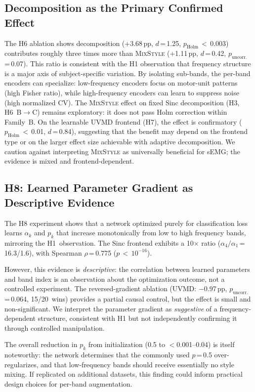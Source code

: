 \documentclass[conference]{IEEEtran}
\newcommand{\pp}{\,pp}
\newcommand{\mixstyle}{\textsc{MixStyle}}
\newcommand{\uvmd}{\textsc{UVMD}}
\begin{document}
\subsection{Decomposition as the Primary Confirmed Effect}
The H6 ablation shows decomposition (+3.68\pp{}, $d$\,=\,1.25, $p_{\mathrm{Holm}}$\,$<$\,0.003) contributes roughly three times more than \mixstyle{} (+1.11\pp{}, $d$\,=\,0.42, $p_{\mathrm{uncorr.}}$\,=\,0.07).
This ratio is consistent with the H1 observation that frequency structure is a major axis of subject-specific variation.
By isolating sub-bands, the per-band encoders can specialize: low-frequency encoders focus on motor-unit patterns (high Fisher ratio), while high-frequency encoders can learn to suppress noise (high normalized CV).
The \mixstyle{} effect on fixed Sinc decomposition (H3, H6~B$\to$C) remains exploratory: it does not pass Holm correction within Family~B.
On the learnable \uvmd{} frontend (H7), the effect is confirmatory ($p_{\mathrm{Holm}}$\,$<$\,0.01, $d$\,=\,0.84), suggesting that the benefit may depend on the frontend type or on the larger effect size achievable with adaptive decomposition.
We caution against interpreting \mixstyle{} as universally beneficial for sEMG; the evidence is mixed and frontend-dependent.

\subsection{H8: Learned Parameter Gradient as Descriptive Evidence}
The H8 experiment shows that a network optimized purely for classification loss learns $\alpha_k$ and $p_k$ that increase monotonically from low to high frequency bands, mirroring the H1~observation.
The Sinc frontend exhibits a 10$\times$ ratio ($\alpha_4/\alpha_1$\,=\,16.3/1.6), with Spearman $\rho$\,=\,0.775 ($p$\,$<$\,$10^{-16}$).

However, this evidence is \emph{descriptive}: the correlation between learned parameters and band index is an observation about the optimization outcome, not a controlled experiment.
The reversed-gradient ablation (UVMD: $-$0.97\pp{}, $p_{\mathrm{uncorr.}}$\,=\,0.064, 15/20~wins) provides a partial causal control, but the effect is small and non-significant.
We interpret the parameter gradient as \emph{suggestive} of a frequency-dependent structure, consistent with H1 but not independently confirming it through controlled manipulation.

The overall reduction in $p_k$ from initialization (0.5 to $<$0.001--0.04) is itself noteworthy: the network determines that the commonly used $p$\,=\,0.5 over-regularizes, and that low-frequency bands should receive essentially no style mixing.
If replicated on additional datasets, this finding could inform practical design choices for per-band augmentation.
\end{document}
